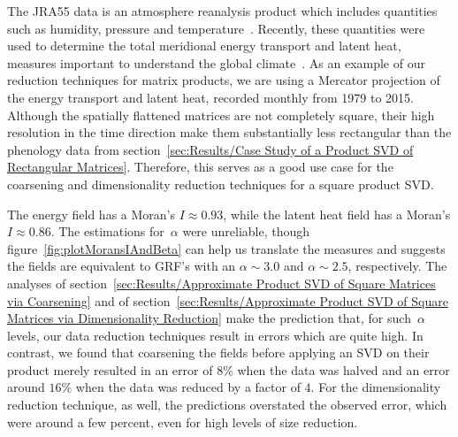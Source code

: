 \documentclass[ijgi,article,submit,moreauthors,pdftex,10pt,a4paper]{Definitions/mdpi}
\begin{document}
The JRA55 data is an atmosphere reanalysis product which includes quantities such as humidity, pressure and temperature~\cite{Kobayashi2015}. Recently, these quantities were used to determine the total meridional energy transport and latent heat, measures important to understand the global climate~\cite{Liu2018}. As an example of our reduction techniques for matrix products, we are using a Mercator projection of the energy transport and latent heat, recorded monthly from 1979 to 2015. Although the spatially flattened matrices are not completely square, their high resolution in the time direction make them substantially less rectangular than the phenology data from section~\ref{sec:Results/Case Study of a Product SVD of Rectangular Matrices}. Therefore, this serves as a good use case for the coarsening and dimensionality reduction techniques for a square product SVD.

The energy field has a Moran's $I \approx 0.93$, while the latent heat field has a Moran's $I \approx 0.86$. The estimations for~$\alpha$ were unreliable, though figure~\ref{fig:plotMoransIAndBeta} can help us translate the measures and suggests the fields are equivalent to GRF's with an $\alpha \sim 3.0$ and $\alpha \sim 2.5$, respectively. The analyses of section~\ref{sec:Results/Approximate Product SVD of Square Matrices via Coarsening} and of section~\ref{sec:Results/Approximate Product SVD of Square Matrices via Dimensionality Reduction} make the prediction that, for such~$\alpha$ levels, our data reduction techniques result in errors which are quite high. In contrast, we found that coarsening the fields before applying an SVD on their product merely resulted in an error of $8\%$ when the data was halved and an error around $16\%$ when the data was reduced by a factor of $4$. For the dimensionality reduction technique, as well, the predictions overstated the observed error, which were around a few percent, even for high levels of size reduction.



\end{document}
